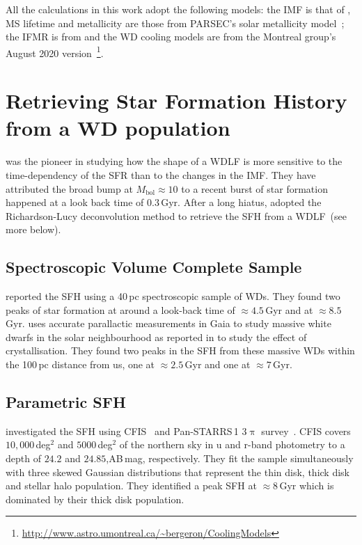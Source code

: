 \documentclass[fleqn,usenatbib]{mnras}
\begin{document}
All the calculations in this work adopt the following models: the IMF is that of
\citet{2003PASP..115..763C}, MS lifetime and metallicity are those from
PARSEC's solar metallicity model~\citep{2012MNRAS.427..127B}; the IFMR is
from \citet{2008MNRAS.387.1693C} and the WD cooling models are from the
Montreal group's August 2020 version~\citep{2020ApJ...901...93B}\footnote{\url{http://www.astro.umontreal.ca/~bergeron/CoolingModels}}.

\section{Retrieving Star Formation History from a WD population}
\citet{1990ApJ...352..605N} was the pioneer in studying how the shape of
a WDLF is more sensitive to the time-dependency of the SFR than to the changes
in the IMF. They have attributed the broad bump at $M_{\mathrm{bol}} \approx 10$
to a recent burst of star formation happened at a look back time of 0.3\,Gyr.
After a long hiatus, \citet{2013MNRAS.434.1549R} adopted the Richardson-Lucy
deconvolution method to retrieve the SFH from a WDLF~(see more below).

\subsection{Spectroscopic Volume Complete Sample}
\citet{2014ApJ...791...92T} reported the SFH using a 40\,pc spectroscopic sample
of WDs. They found two peaks of star formation at around a look-back time of
$\approx4.5$\,Gyr and at $\approx8.5$\,Gyr. \citet{2019ApJ...878L..11I}
uses accurate parallactic measurements in Gaia to study massive white dwarfs in
the solar neighbourhood as reported in \citet{2019Natur.565..202T} to study the
effect of crystallisation. They found two peaks in the SFH from these massive
WDs within the 100\,pc distance from us, one at $\approx2.5$\,Gyr and one at
$\approx7$\,Gyr.

\subsection{Parametric SFH}
\citet{2019ApJ...887..148F} investigated the SFH using
CFIS~\citep{2017ApJ...848..128I} and Pan-STARRS\,1 3$\uppi$
survey~\citep{2016arXiv161205560C}. CFIS covers $10,000$\,deg$^2$ and
$5000$\,deg$^2$ of the northern sky in u and r-band photometry to a depth of
$24.2$ and $24.85$,AB\,mag, respectively. They fit the sample simultaneously
with three skewed Gaussian distributions that represent the thin disk, thick
disk and stellar halo population. They identified a peak SFH at $\approx8$\,Gyr
which is dominated by their thick disk population.
\end{document}
